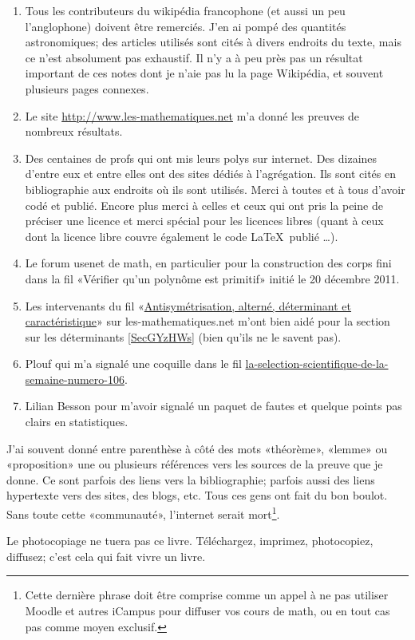 \begin{enumerate}
    \item
        Tous les contributeurs du wikipédia francophone (et aussi un peu l'anglophone) doivent être remerciés. J'en ai pompé des quantités astronomiques; des articles utilisés sont cités à divers endroits du texte, mais ce n'est absolument pas exhaustif. Il n'y a à peu près pas un résultat important de ces notes dont je n'aie pas lu la page Wikipédia, et souvent plusieurs pages connexes.
    \item
        Le site \url{http://www.les-mathematiques.net} m'a donné les preuves de nombreux résultats.
    \item
        Des centaines de profs qui ont mis leurs polys sur internet. Des dizaines d'entre eux et entre elles ont des sites dédiés à l'agrégation. Ils sont cités en bibliographie aux endroits où ils sont utilisés. Merci à toutes et à tous d'avoir codé et publié. Encore plus merci à celles et ceux qui ont pris la peine de préciser une licence et merci spécial pour les licences libres (quant à ceux dont la licence libre couvre également le code \LaTeX\ publié \ldots).
    \item
        Le forum usenet de math, en particulier pour la construction des corps fini dans la fil «Vérifier qu'un polynôme est primitif» initié le 20 décembre 2011.
    \item
        Les intervenants du fil «\href{http://www.les-mathematiques.net/phorum/read.php?2,302266}{Antisymétrisation, alterné, déterminant et caractéristique}» sur les-mathematiques.net m'ont bien aidé pour la section sur les déterminants \ref{SecGYzHWs} (bien qu'ils ne le savent pas).
    \item
        Plouf qui m'a signalé une coquille dans le fil \href{http://passeurdesciences.blog.lemonde.fr/2014/01/24/la-selection-scientifique-de-la-semaine-numero-106}{la-selection-scientifique-de-la-semaine-numero-106}.
    \item
        Lilian Besson pour m'avoir signalé un paquet de fautes et quelque points pas clairs en statistiques.
\end{enumerate}

J'ai souvent donné entre parenthèse à côté des mots «théorème», «lemme» ou «proposition» une ou plusieurs références vers les sources de la preuve que je donne. Ce sont parfois des liens vers la bibliographie; parfois aussi des liens hypertexte vers des sites, des blogs, etc. Tous ces gens ont fait du bon boulot. Sans toute cette «communauté», l'internet serait mort\footnote{Cette dernière phrase doit être comprise comme un appel à ne pas utiliser Moodle et autres iCampus pour diffuser vos cours de math, ou en tout cas pas comme moyen exclusif.}.

\begin{center}
Le photocopiage ne tuera pas ce livre. Téléchargez, imprimez, photocopiez, diffusez; c'est cela qui fait vivre un livre.
\end{center}

